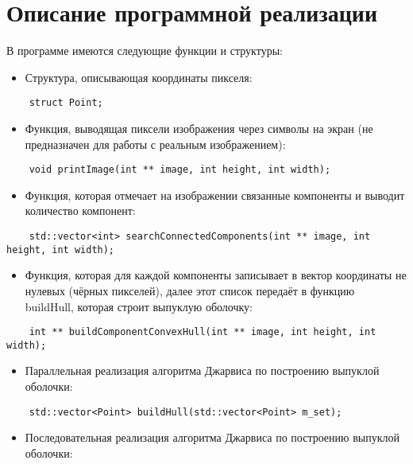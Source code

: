 \documentclass{report}
\begin{document}
\section*{Описание программной реализации}
В программе имеются следующие функции и структуры:
\begin{itemize}
\item Структура, описывающая координаты пикселя: 
\end{itemize}
\begin{lstlisting}
	struct Point;
\end{lstlisting}
\begin{itemize}
\item Функция, выводящая пиксели изображения через символы на экран (не предназначен для работы с реальным изображением): 
\end{itemize}
\begin{lstlisting}
	void printImage(int ** image, int height, int width);
\end{lstlisting}
\begin{itemize}
\item Функция, которая отмечает на изображении связанные компоненты и выводит количество компонент:
\end{itemize}
\begin{lstlisting}
	std::vector<int> searchConnectedComponents(int ** image, int height, int width);
\end{lstlisting}
\begin{itemize}
\item Функция, которая для каждой компоненты записывает в вектор координаты не нулевых (чёрных пикселей), далее этот список передаёт в функцию buildHull, которая строит выпуклую оболочку: 
\end{itemize}
\begin{lstlisting}
	int ** buildComponentConvexHull(int ** image, int height, int width);
\end{lstlisting}
\begin{itemize}
\item Параллельная реализация алгоритма Джарвиса по построению выпуклой оболочки: 
\end{itemize}
\begin{lstlisting}
	std::vector<Point> buildHull(std::vector<Point> m_set);
\end{lstlisting}
\begin{itemize}
\item Последовательная реализация алгоритма Джарвиса по построению выпуклой оболочки: 
\end{itemize}
\end{document}

